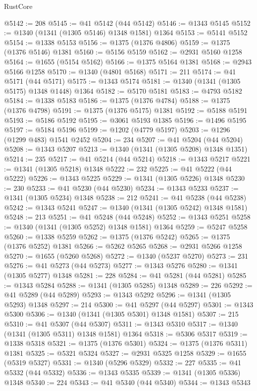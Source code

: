 \begin{lexlean}{RustCore}
\begin{coremodule}
@5142 := 208
@5145 := @41 @5142 (@44 @5142)
@5146 := @1343 @5145
@5152 := @1340 (@1341 (@1305 @5146) @1348 @1581) @1364
@5153 := @5141 @5152
@5154 := @1338 @5153
@5156 := @1375 (@1376 @4806)
@5159 := @1375 (@1376 @5146) @1381
@5160 := @5156 @5159
@5162 := @2931 @5160 @1258
@5164 := @1655 (@5154 @5162)
@5166 := @1375 @5164 @1381
@5168 := @2943 @5166 @1258
@5170 := @1340 (@4801 @5168)
@5171 := 211
@5174 := @41 @5171 (@44 @5171)
@5175 := @1343 @5174
@5181 := @1340 (@1341 (@1305 @5175) @1348 @1448) @1364
@5182 := @5170 @5181
@5183 := @4793 @5182
@5184 := @1338 @5183
@5186 := @1375 (@1376 @4784)
@5188 := @1375 (@1376 @4798)
@5191 := @1375 (@1376 @5175) @1381
@5192 := @5188 @5191
@5193 := @5186 @5192
@5195 := @3061 @5193 @1385
@5196 := @1496 @5195
@5197 := @5184 @5196
@5199 := @1202 (@4779 @5197)
@5203 := @1296 (@1299 @483) @1541 @2452
@5204 := 234
@5207 := @41 @5204 (@44 @5204)
@5208 := @1343 @5207
@5213 := @1340 (@1341 (@1305 @5208) @1348 @1351)
@5214 := 235
@5217 := @41 @5214 (@44 @5214)
@5218 := @1343 @5217
@5221 := @1341 (@1305 @5218) @1348
@5222 := 232
@5225 := @41 @5222 (@44 @5222)
@5226 := @1343 @5225
@5229 := @1341 (@1305 @5226) @1348
@5230 := 230
@5233 := @41 @5230 (@44 @5230)
@5234 := @1343 @5233
@5237 := @1341 (@1305 @5234) @1348
@5238 := 212
@5241 := @41 @5238 (@44 @5238)
@5242 := @1343 @5241
@5247 := @1340 (@1341 (@1305 @5242) @1348 @1581)
@5248 := 213
@5251 := @41 @5248 (@44 @5248)
@5252 := @1343 @5251
@5258 := @1340 (@1341 (@1305 @5252) @1348 @1581) @1364
@5259 := @5247 @5258
@5260 := @1338 @5259
@5262 := @1375 (@1376 @5242)
@5265 := @1375 (@1376 @5252) @1381
@5266 := @5262 @5265
@5268 := @2931 @5266 @1258
@5270 := @1655 (@5260 @5268)
@5272 := @1340 (@5237 @5270)
@5273 := 231
@5276 := @41 @5273 (@44 @5273)
@5277 := @1343 @5276
@5280 := @1341 (@1305 @5277) @1348
@5281 := 228
@5284 := @41 @5281 (@44 @5281)
@5285 := @1343 @5284
@5288 := @1341 (@1305 @5285) @1348
@5289 := 226
@5292 := @41 @5289 (@44 @5289)
@5293 := @1343 @5292
@5296 := @1341 (@1305 @5293) @1348
@5297 := 214
@5300 := @41 @5297 (@44 @5297)
@5301 := @1343 @5300
@5306 := @1340 (@1341 (@1305 @5301) @1348 @1581)
@5307 := 215
@5310 := @41 @5307 (@44 @5307)
@5311 := @1343 @5310
@5317 := @1340 (@1341 (@1305 @5311) @1348 @1581) @1364
@5318 := @5306 @5317
@5319 := @1338 @5318
@5321 := @1375 (@1376 @5301)
@5324 := @1375 (@1376 @5311) @1381
@5325 := @5321 @5324
@5327 := @2931 @5325 @1258
@5329 := @1655 (@5319 @5327)
@5331 := @1340 (@5296 @5329)
@5332 := 227
@5335 := @41 @5332 (@44 @5332)
@5336 := @1343 @5335
@5339 := @1341 (@1305 @5336) @1348
@5340 := 224
@5343 := @41 @5340 (@44 @5340)
@5344 := @1343 @5343

\end{coremodule}
\end{lexlean}
